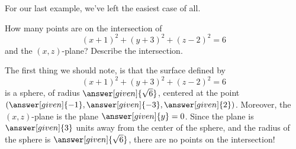\documentclass{ximera}
\begin{document}
For our last example, we've left the easiest case of all.

\begin{example}
  How many points are on the intersection of
  \[
  (x+1)^2 + (y+3)^2 + (z-2)^2 = 6
  \]
  and the $(x,z)$-plane? Describe the intersection.
  \begin{explanation}
    The first thing we should note, is that the surface defined by
    \[
    (x+1)^2 + (y+3)^2 + (z-2)^2 = 6
    \]
    is a sphere, of radius $\answer[given]{\sqrt{6}}$, centered at the
    point
    $(\answer[given]{-1},\answer[given]{-3},\answer[given]{2})$. Moreover,
    the $(x,z)$-plane is the plane $\answer[given]{y}=0$. Since the
    plane is $\answer[given]{3}$ units away from the center of the
    sphere, and the radius of the sphere is
    $\answer[given]{\sqrt{6}}$, there are no points on the intersection!
  \end{explanation}
\end{example}





\end{document}
